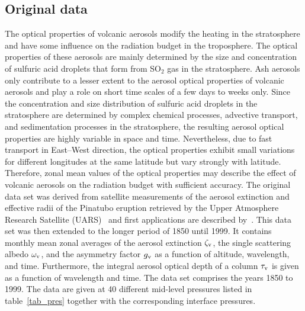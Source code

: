 \begin{appendix}
\subsection{Original data} 

The optical properties of volcanic aerosols modify the heating in the
stratosphere and have some influence on the radiation budget in the
troposphere. The optical properties of these aerosols are mainly
determined by the size and concentration of sulfuric acid droplets
that form from SO$_2$ gas in the stratosphere. Ash aerosols only contribute
to a lesser extent to the aerosol optical properties of volcanic
aerosols and play a role on short time scales of a few days to weeks only. 
Since the concentration and size distribution of sulfuric acid
droplets in the stratosphere are determined by complex chemical
processes, advective transport, and sedimentation processes in the
stratosphere, the resulting aerosol optical properties are highly
variable in space and time. Nevertheless, due to fast transport in
East--West direction, the optical properties exhibit small variations
for different longitudes at the same latitude but vary strongly with
latitude. Therefore, zonal mean values of the optical properties may
describe the effect of volcanic aerosols on the radiation budget with
sufficient accuracy. The original data set was derived from satellite
measurements of the aerosol extinction and effective
radii of the Pinatubo eruption retrieved by the Upper Atmosphere
Research Satellite (UARS)~\cite{ste987} and first applications
are described by~\cite{ste049,ste093}. This data set was then
extended to the 
longer period of 1850 until 1999. 
It contains monthly mean zonal
averages of the aerosol extinction $\zeta_{\rm v}$, the single scattering
albedo $\omega_{\rm v}$, and the asymmetry factor $g_{\rm v}$ as a function of
altitude, wavelength, and time. Furthermore, the integral aerosol
optical depth of a column $\tau_{\rm v}$ is given as a function of wavelength
and time. The data set comprises the years 1850 to 1999. The data are
given at 40 different mid-level pressures listed in
table~\ref{tab_pres} together with the corresponding interface pressures.
 

\end{appendix}
